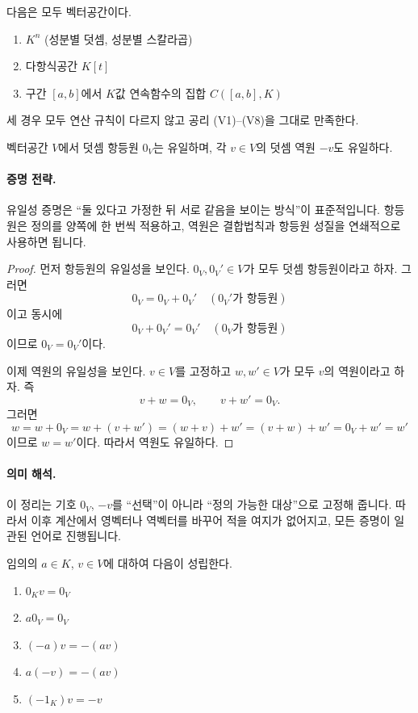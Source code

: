 \begin{example}
다음은 모두 벡터공간이다.
\begin{enumerate}[label=(\alph*)]
\item $K^n$ (성분별 덧셈, 성분별 스칼라곱)
\item 다항식공간 $K[t]$
\item 구간 $[a,b]$에서 $K$값 연속함수의 집합 $C([a,b],K)$
\end{enumerate}
세 경우 모두 연산 규칙이 다르지 않고 공리 (V1)--(V8)을 그대로 만족한다.
\end{example}

\begin{theorem}
벡터공간 $V$에서 덧셈 항등원 $0_V$는 유일하며, 각 $v\in V$의 덧셈 역원 $-v$도 유일하다.
\end{theorem}

\paragraph{증명 전략.}
유일성 증명은 ``둘 있다고 가정한 뒤 서로 같음을 보이는 방식''이 표준적입니다. 항등원은 정의를 양쪽에 한 번씩 적용하고, 역원은 결합법칙과 항등원 성질을 연쇄적으로 사용하면 됩니다.

\begin{proof}
먼저 항등원의 유일성을 보인다. $0_V,0_V'\in V$가 모두 덧셈 항등원이라고 하자. 그러면
\[
0_V=0_V+0_V' \quad(\text{$0_V'$가 항등원})
\]
이고 동시에
\[
0_V+0_V'=0_V' \quad(\text{$0_V$가 항등원})
\]
이므로 $0_V=0_V'$이다.

이제 역원의 유일성을 보인다. $v\in V$를 고정하고 $w,w'\in V$가 모두 $v$의 역원이라고 하자. 즉
\[
v+w=0_V,\qquad v+w'=0_V.
\]
그러면
\[
w=w+0_V=w+(v+w')=(w+v)+w'=(v+w)+w'=0_V+w'=w'
\]
이므로 $w=w'$이다. 따라서 역원도 유일하다.
\end{proof}

\paragraph{의미 해석.}
이 정리는 기호 $0_V$, $-v$를 ``선택''이 아니라 ``정의 가능한 대상''으로 고정해 줍니다. 따라서 이후 계산에서 영벡터나 역벡터를 바꾸어 적을 여지가 없어지고, 모든 증명이 일관된 언어로 진행됩니다.

\begin{theorem}
임의의 $a\in K$, $v\in V$에 대하여 다음이 성립한다.
\begin{enumerate}[label=(\roman*)]
\item $0_Kv=0_V$
\item $a0_V=0_V$
\item $(-a)v=-(av)$
\item $a(-v)=-(av)$
\item $(-1_K)v=-v$
\end{enumerate}
\end{theorem}

